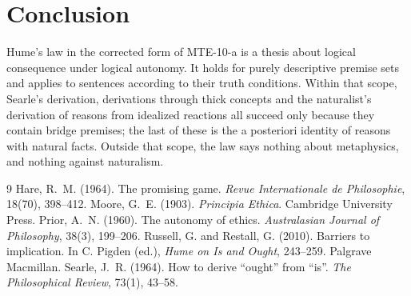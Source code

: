 \documentclass{situationist-preprint}
\begin{document}
\section{Conclusion}

Hume's law in the corrected form of MTE-10-a is a thesis about logical consequence under logical autonomy. It holds for purely descriptive premise sets and applies to sentences according to their truth conditions. Within that scope, Searle's derivation, derivations through thick concepts and the naturalist's derivation of reasons from idealized reactions all succeed only because they contain bridge premises; the last of these is the a posteriori identity of reasons with natural facts. Outside that scope, the law says nothing about metaphysics, and nothing against naturalism.

\begin{thebibliography}{9}\small
{} Hare, R.~M. (1964). The promising game. \emph{Revue Internationale de Philosophie}, 18(70), 398--412.
 Moore, G.~E. (1903). \emph{Principia Ethica}. Cambridge University Press.
 Prior, A.~N. (1960). The autonomy of ethics. \emph{Australasian Journal of Philosophy}, 38(3), 199--206.
 Russell, G. and Restall, G. (2010). Barriers to implication. In C. Pigden (ed.), \emph{Hume on Is and Ought}, 243--259. Palgrave Macmillan.
 Searle, J.~R. (1964). How to derive \enquote{ought} from \enquote{is}. \emph{The Philosophical Review}, 73(1), 43--58.
\end{thebibliography}
\end{document}
